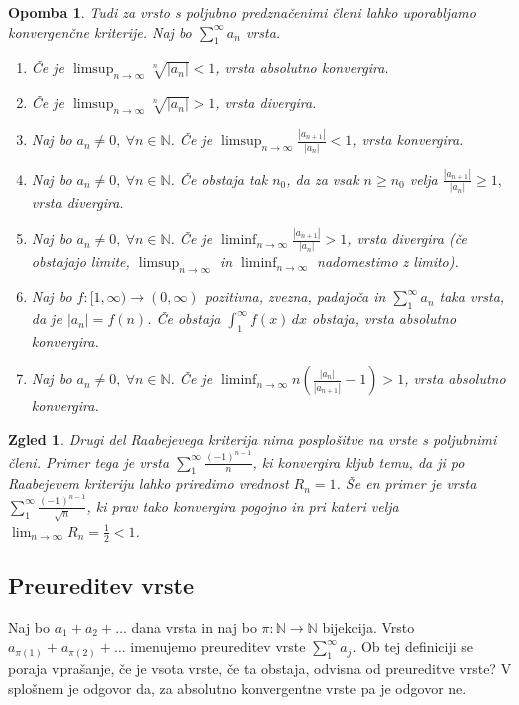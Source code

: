 \documentclass[10pt, a4paper]{article}
\newtheorem*{opomba}{Opomba}
\newtheorem{zgled}[izr]{Zgled}
\newcommand{\N}{\mathbb {N}}
\newcommand{\limzap}[1]{\lim_{n \to \infty} {#1}}
\begin{document}
\begin{opomba}
    Tudi za vrsto s poljubno predznačenimi členi lahko uporabljamo konvergenčne kriterije.
    Naj bo $\sum_1 ^\infty a_n$ vrsta.
    \begin{enumerate}
        \item Če je $\limsup_{n \to \infty} \sqrt[n]{|a_n|} < 1$, vrsta absolutno konvergira.
        \item Če je $\limsup_{n \to \infty} \sqrt[n]{|a_n|} > 1$, vrsta divergira.
        \item Naj bo $a_n \neq 0,\ \forall n \in \N$. 
        Če je $\limsup_{n \to \infty} \frac{|a_{n+1}|}{|a_n|} < 1$, vrsta konvergira.
        \item Naj bo $a_n \neq 0,\ \forall n \in \N$.
        Če obstaja tak $n_0$, da za vsak $n \geq n_0$ velja $\frac{|a_{n+1}|}{|a_n|} \geq 1,$ vrsta divergira.
        \item Naj bo $a_n \neq 0,\ \forall n \in \N$. 
        Če je $\liminf_{n \to \infty} \frac{|a_{n+1}|}{|a_n|} > 1$, vrsta divergira (če obstajajo limite, $\limsup_{n \to \infty}$ in $\liminf_{n \to \infty}$ nadomestimo z limito).
        \item Naj bo $f:[1, \infty) \rightarrow (0, \infty)$ pozitivna, zvezna, padajoča in $\sum_1 ^\infty a_n$ taka vrsta, da je $|a_n| = f(n)$. Če obstaja $\int_1 ^\infty f(x)\,dx$ obstaja, vrsta absolutno konvergira.
        \item Naj bo $a_n \neq 0,\ \forall n \in \N$. Če je $\liminf_{n \to \infty} n \left(\frac{|a_n|}{|a_{n+1}|} - 1\right) > 1$, vrsta absolutno konvergira.
    \end{enumerate}
\end{opomba}

\begin{zgled}
    Drugi del Raabejevega kriterija nima posplošitve na vrste s poljubnimi členi.
    Primer tega je vrsta $\sum_1 ^\infty \frac{(-1)^{n-1}}{n}$, ki konvergira kljub temu, da ji po Raabejevem kriteriju lahko priredimo vrednost $R_n = 1$.
    Še en primer je vrsta $\sum_1 ^\infty \frac{(-1)^{n-1}}{\sqrt{n}}$, ki prav tako konvergira pogojno in pri kateri velja $\limzap{R_n} = \frac{1}{2} < 1$.
\end{zgled}

\subsection{Preureditev vrste}

Naj bo $a_1 + a_2 + \dots$ dana vrsta in naj bo $\pi: \N \rightarrow \N$ bijekcija.
Vrsto $a_{\pi(1)} + a_{\pi(2)} + \dots$ imenujemo preureditev vrste $\sum_1 ^\infty a_j$.
Ob tej definiciji se poraja vprašanje, če je vsota vrste, če ta obstaja, odvisna od preureditve vrste?
V splošnem je odgovor da, za absolutno konvergentne vrste pa je odgovor ne.
\end{document}
